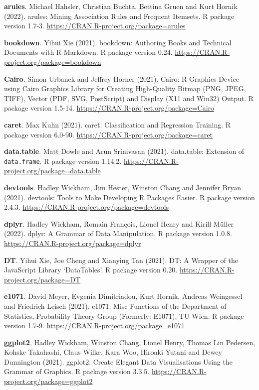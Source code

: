 \documentclass[
  11pt,
]{scrbook}
\begin{document}
\textbf{arules}. Michael Hahsler, Christian Buchta, Bettina Gruen and Kurt Hornik (2022). arules: Mining Association Rules and Frequent Itemsets. R package version 1.7-3. \url{https://CRAN.R-project.org/package=arules}

\textbf{bookdown}. Yihui Xie (2021). bookdown: Authoring Books and Technical Documents with R Markdown. R package version 0.24. \url{https://CRAN.R-project.org/package=bookdown}

\textbf{Cairo}. Simon Urbanek and Jeffrey Horner (2021). Cairo: R Graphics Device using Cairo Graphics Library for Creating
High-Quality Bitmap (PNG, JPEG, TIFF), Vector (PDF, SVG,
PostScript) and Display (X11 and Win32) Output. R package version 1.5-14. \url{https://CRAN.R-project.org/package=Cairo}

\textbf{caret}. Max Kuhn (2021). caret: Classification and Regression Training. R package version 6.0-90. \url{https://CRAN.R-project.org/package=caret}

\textbf{data.table}. Matt Dowle and Arun Srinivasan (2021). data.table: Extension of \texttt{data.frame}. R package version 1.14.2. \url{https://CRAN.R-project.org/package=data.table}

\textbf{devtools}. Hadley Wickham, Jim Hester, Winston Chang and Jennifer Bryan (2021). devtools: Tools to Make Developing R Packages Easier. R package version 2.4.3. \url{https://CRAN.R-project.org/package=devtools}

\textbf{dplyr}. Hadley Wickham, Romain François, Lionel Henry and Kirill Müller (2022). dplyr: A Grammar of Data Manipulation. R package version 1.0.8. \url{https://CRAN.R-project.org/package=dplyr}

\textbf{DT}. Yihui Xie, Joe Cheng and Xianying Tan (2021). DT: A Wrapper of the JavaScript Library `DataTables'. R package version 0.20. \url{https://CRAN.R-project.org/package=DT}

\textbf{e1071}. David Meyer, Evgenia Dimitriadou, Kurt Hornik, Andreas Weingessel and Friedrich Leisch (2021). e1071: Misc Functions of the Department of Statistics, Probability
Theory Group (Formerly: E1071), TU Wien. R package version 1.7-9. \url{https://CRAN.R-project.org/package=e1071}

\textbf{ggplot2}. Hadley Wickham, Winston Chang, Lionel Henry, Thomas Lin Pedersen, Kohske Takahashi, Claus Wilke, Kara Woo, Hiroaki Yutani and Dewey Dunnington (2021). ggplot2: Create Elegant Data Visualisations Using the Grammar of Graphics. R package version 3.3.5. \url{https://CRAN.R-project.org/package=ggplot2}
\end{document}
